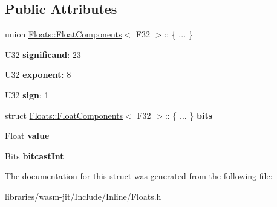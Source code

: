 \subsection*{Public Attributes}
\begin{DoxyCompactItemize}
\item 
\mbox{\label{struct_floats_1_1_float_components_3_01_f32_01_4_a2f02b4cf262dcce9c249d99d85ab32d9}} 
union \mbox{\hyperlink{struct_floats_1_1_float_components}{Floats\+::\+Float\+Components}}$<$ F32 $>$\+:: \{ ... \}  
\item 
\mbox{\label{struct_floats_1_1_float_components_3_01_f32_01_4_ac33a6f731b4e00deaa3bc8505793a978}} 
U32 {\bfseries significand}\+: 23
\item 
\mbox{\label{struct_floats_1_1_float_components_3_01_f32_01_4_a7c95cabde9198387d3196e46524cd0c1}} 
U32 {\bfseries exponent}\+: 8
\item 
\mbox{\label{struct_floats_1_1_float_components_3_01_f32_01_4_ad2e3b85f50932ed324b1e6d2dde59cdf}} 
U32 {\bfseries sign}\+: 1
\item 
\mbox{\label{struct_floats_1_1_float_components_3_01_f32_01_4_a47bdf9a12fcd8d1660a6fa0c7c235368}} 
struct \mbox{\hyperlink{struct_floats_1_1_float_components}{Floats\+::\+Float\+Components}}$<$ F32 $>$\+:: \{ ... \}  {\bfseries bits}
\item 
\mbox{\label{struct_floats_1_1_float_components_3_01_f32_01_4_aade8a214be24ac9a0ae0a0655fe64aa5}} 
Float {\bfseries value}
\item 
\mbox{\label{struct_floats_1_1_float_components_3_01_f32_01_4_a9f707c5c6ca42deecd801f364299aba4}} 
Bits {\bfseries bitcast\+Int}
\end{DoxyCompactItemize}


The documentation for this struct was generated from the following file\+:\begin{DoxyCompactItemize}
\item 
libraries/wasm-\/jit/\+Include/\+Inline/Floats.\+h\end{DoxyCompactItemize}
